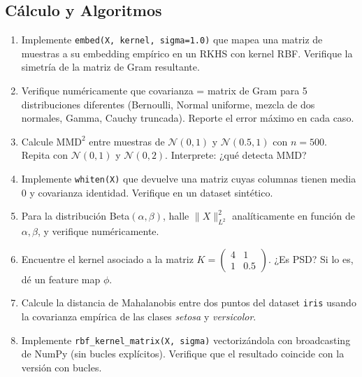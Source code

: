 \subsection*{Cálculo y Algoritmos}
\begin{enumerate}[resume]
	\item[$\star\star$] Implemente \texttt{embed(X, kernel, sigma=1.0)} que mapea una matriz de muestras a su embedding empírico en un RKHS con kernel RBF. Verifique la simetría de la matriz de Gram resultante.
	\item[$\star\star$] Verifique numéricamente que covarianza = matrix de Gram para 5 distribuciones diferentes (Bernoulli, Normal uniforme, mezcla de dos normales, Gamma, Cauchy truncada). Reporte el error máximo en cada caso.
	\item[$\star\star$] Calcule $\mathrm{MMD}^2$ entre muestras de $\mathcal{N}(0,1)$ y $\mathcal{N}(0.5,1)$ con $n=500$. Repita con $\mathcal{N}(0,1)$ y $\mathcal{N}(0,2)$. Interprete: ¿qué detecta MMD?
	\item[$\star\star$] Implemente \texttt{whiten(X)} que devuelve una matriz cuyas columnas tienen media 0 y covarianza identidad. Verifique en un dataset sintético.
	\item[$\star\star$] Para la distribución Beta$(\alpha,\beta)$, halle $\|X\|_{L^2}^2$ analíticamente en función de $\alpha,\beta$, y verifique numéricamente.
	\item[$\star\star$] Encuentre el kernel asociado a la matriz $K = \begin{pmatrix} 4 & 1 \\ 1 & 0.5 \end{pmatrix}$. ¿Es PSD? Si lo es, dé un feature map $\phi$.
	\item[$\star\star$] Calcule la distancia de Mahalanobis entre dos puntos del dataset \texttt{iris} usando la covarianza empírica de las clases \textit{setosa} y \textit{versicolor}.
	\item[$\star\star$] Implemente \texttt{rbf\_kernel\_matrix(X,\allowbreak{} sigma)} vectorizándola con broadcasting de NumPy (sin bucles explícitos). Verifique que el resultado coincide con la versión con bucles.
\end{enumerate}

